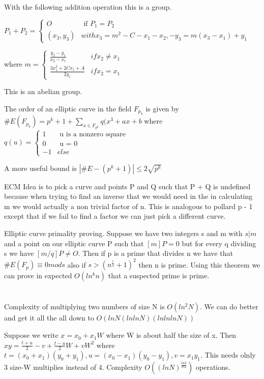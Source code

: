\documentclass{article}
\begin{document}
With the following addition operation this is a group. 

$P_1 + P_2 = \begin{cases}
O & \text{ if } P_1 = P_2 \\
(x_3, y_3) & with x_3 = m^2 - C - x_1 - x_2, -y_3 = m ( x_3 - x_1 ) + y_1
\end{cases}$

where $m = \begin{cases}
\frac{y_2 - y_1}{x_2 - x_1} & if x_2 \neq x_1 \\
\frac{3x_1^2 + 2Cx_1 + A}{2y_1} & if x_2 = x_1 
\end{cases}$

This is an abelian group. 

The order of an elliptic curve in the field $F_{p_k}$ is given by $\#E(F_{p_k}) = p^k + 1 + \sum_{x \in F_{p^k}} q ( x^3 + ax + b$
where $q ( u ) = \begin{cases} 1 & \text{ u is a nonzero square} \\ 0 & \text { u = 0} \\ -1 & else \end{cases} $

A more useful bound is $| \#E - (p^k  + 1) | \leq 2 \sqrt{p^k}$

ECM 
Idea is to pick a curve and points P and Q such that P + Q is undefined because when trying to find an inverse that we would need in the in calculating m we would actually a non trivial factor of n. This is analogous to pollard p - 1 except that if we fail to find a factor we can just pick a different curve. 

Elliptic curve primality proving. 
Suppose we have two integers s and m with $s | m$ and a point on our elliptic curve P such that $[m] P = 0$ but for every q dividing s we have $[m / q ] P \neq O$. Then if p is a prime that divides n we have that $\#E ( F_p ) \equiv 0 mod s$ also if $s > (n^\frac{1}{4} + 1)^ 2$ then n is prime. 
Using this theorem we can prove in expected $O(ln^k n)$ that a suspected prime is prime. 

\setcounter{section}{8}
\section{}

Complexity of multiplying two numbers of size N is $O(ln^2 N)$. We can do better and get it all the all down to $O(ln N ( ln ln N ) ( ln ln ln N ))$

Suppose we write $x = x_0 + x_1 W$ where W is about half the size of x. Then $x y  = \frac{t + u}{2} - v + \frac{t - u}{2} W + v W^2$ where $t = (x_0 + x_1 ) (y_0 + y_1), u = (x_0 - x_1) (y_0 - y_1 ), v = x_1 y_1$. This needs olnly 3 size-W multiplies instead of 4. Complexity $O ( ( ln N) ^ {\frac{ln 3}{ln 2}} ) $ operations.
\end{document}
